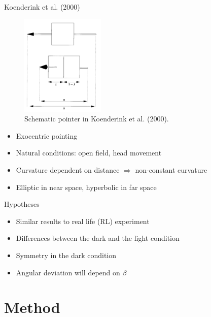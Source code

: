 \documentclass{beamer}
\begin{document}
\begin{frame}{Koenderink et al. (2000)}
    \begin{minipage}{5cm}
        \begin{figure}
            \raggedright
            \includegraphics[width = 4cm, left]{Images/PointerSkize.PNG}
            \caption{Schematic pointer in Koenderink et al. (2000).}
            \label{schematicPointer}
        \end{figure}
    \end{minipage}
    \begin{minipage}{5cm}
        \begin{itemize}
            \item Exocentric pointing
            \item Natural conditions: open field, head movement
            \item Curvature dependent on distance $\Rightarrow$ non-constant curvature
            \item Elliptic in near space, hyperbolic in far space
        \end{itemize}
    \end{minipage}
\end{frame}

\begin{frame}{Hypotheses}
    \begin{itemize}
        \item Similar results to real life (RL) experiment
        \item Differences between the dark and the light condition
        \item Symmetry in the dark condition
        \item Angular deviation will depend on $\beta$
        
    \end{itemize}
\end{frame}

\section{Method}
\end{document}
